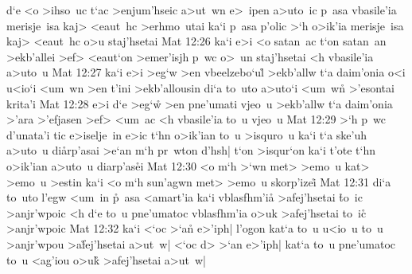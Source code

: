 d`e
<o
>ihso~uc
t`ac
>enjum'hseic
a>ut~wn
e>~ipen
a>uto~ic
p~asa
vbasile'ia
merisje~isa
kaj>
<eaut~hc
>erhmo~utai
ka`i
p~asa
p'olic
>`h
o>ik'ia
merisje~isa
kaj>
<eaut~hc
o>u
staj'hsetai\bibvsend
\vs Mat 12:26
ka`i
e>i
<o
satan~ac
t`on
satan~an
>ekb'allei
>ef>
<eaut`on
>emer'isjh
p~wc
o>~un
staj'hsetai
<h
vbasile'ia
a>uto~u\bibvsend
\vs Mat 12:27
ka`i
e>i
>eg`w
>en
vbeelzebo`u\r{l}
>ekb'allw
t`a
daim'onia
o<i
u<io`i
<um~wn
>en
t'ini
>ekb'allousin
di`a
to~uto
a>uto`i
<um~wn\r{}
>'esontai
krita'i\bibvsend
\vs Mat 12:28
e>i
d`e
>eg`w\r{}
>en
pne'umati
vjeo~u
>ekb'allw
t`a
daim'onia
>'ara
>'efjasen
>ef>
<um~ac
<h
vbasile'ia
to~u
vjeo~u\bibvsend
\vs Mat 12:29
>`h
p~wc
d'unata'i
tic
e>iselje~in
e>ic
t`hn
o>ik'ian
to~u
>isquro~u
ka`i
t`a
ske'uh
a>uto~u
di\r{a}rp'asai
>e`an
m`h
pr~wton
d'hsh|
t`on
>isqur`on
ka`i
t'ote
t`hn
o>ik'ian
a>uto~u
diarp'as\r{e}i\bibvsend
{}
\vs Mat 12:30
<o
m`h
>`wn
met>
>emo~u
kat>
>emo~u
>estin
ka`i
<o
m`h
sun'agwn
met>
>emo~u
skorp'ize\r{i}\bibvsend
{}
\vs Mat 12:31
di`a
to~uto
l'egw
<um~in
\r{p}~asa
<amart'ia
ka`i
vblasfhm'i\r{a}
>afej'hsetai
\r{t}o~ic
>anjr'wpoic
<h
d`e
to~u
pne'umatoc
vblasfhm'ia
o>uk
>afej'hsetai
to~ic\r{}
>anjr'wpoic\bibvsend
\vs Mat 12:32
ka`i
<`oc
>`a\r{n}
e>'iph|
l'ogon
kat`a
to~u
u<io~u
to~u
>anjr'wpou
>a\r{f}ej'hsetai
a>ut~w|
<`oc
d>
>`an
e>'iph|
kat`a
to~u
pne'umatoc
to~u
<ag'iou
o>uk\r{}
>afej'hsetai
a>ut~w|
